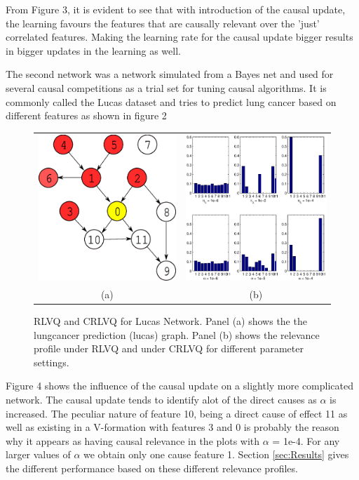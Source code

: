 \documentclass{esannV2}
\begin{document}
From Figure 3, it is evident to see that with introduction of the causal update, the learning favours the features that are causally relevant over the 'just' correlated features. Making the learning rate for the causal update bigger results in bigger updates in the learning as well.

The second network was a network simulated from a Bayes net and used for several causal competitions as a trial set for tuning causal algorithms. It is commonly called the Lucas dataset\cite{12} and tries to predict lung cancer based on different features as shown in figure 2\\

\begin{figure}
\begin{tabular}{cc}
\includegraphics[width=.3\textwidth]{lucasgraph.eps} & 
\includegraphics[width=.7\textwidth, height=0.6\textwidth]{lucaslambda.eps} \\
(a) &  (b)  
\end{tabular}
\label{fig:lucas}
\caption{RLVQ and CRLVQ for Lucas Network. Panel (a) shows the the lungcancer prediction (lucas) graph. Panel (b) shows the relevance profile under RLVQ and under CRLVQ for different parameter settings.}
\end{figure}

Figure 4 shows the influence of the causal update on a slightly more complicated network. The causal update tends to identify alot of the direct causes as $\alpha$ is increased. The peculiar nature of feature 10, being a direct cause of effect 11 as well as existing in a V-formation with features 3 and 0 is probably the reason why it appears as having causal relevance in the plots with $\alpha$ = 1e-4. For any larger values of $\alpha$ we obtain only one cause feature 1. Section \ref{sec:Results} gives the different performance based on these different relevance profiles.
\end{document}
